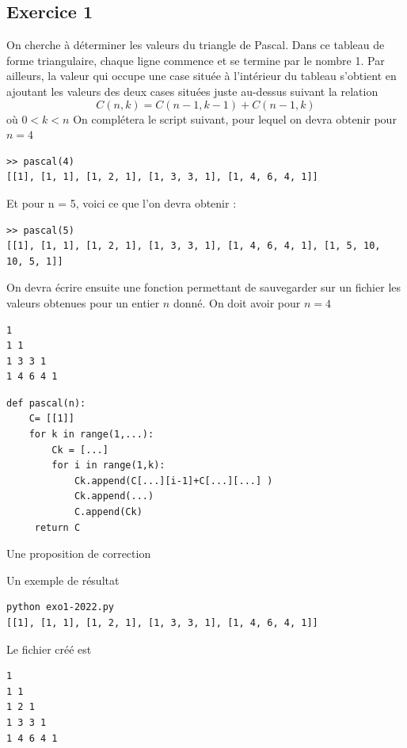 \documentclass[a4paper,12pt]{article}
\begin{document}
\subsection{Exercice 1}
\begin{leftbar}
On cherche à d\'eterminer les valeurs du triangle de Pascal. Dans ce tableau de forme
triangulaire, chaque ligne commence et se termine par le nombre 1. Par ailleurs, la valeur
qui occupe une case situ\'ee à l’int\'erieur du tableau s’obtient en ajoutant les valeurs des
deux cases situ\'ees juste au-dessus suivant la relation
\begin{equation*}
C(n,k)=C(n-1,k-1)+C(n-1,k)
\end{equation*}
o\`u $0<k<n$
On compl\'etera le script suivant, pour lequel on devra obtenir pour $n = 4$
\begin{verbatim}
>> pascal(4)
[[1], [1, 1], [1, 2, 1], [1, 3, 3, 1], [1, 4, 6, 4, 1]]
\end{verbatim}
Et pour n = 5, voici ce que l’on devra obtenir :
\begin{verbatim}
>> pascal(5)
[[1], [1, 1], [1, 2, 1], [1, 3, 3, 1], [1, 4, 6, 4, 1], [1, 5, 10,
10, 5, 1]]
\end{verbatim}
On devra \'ecrire ensuite une fonction permettant de sauvegarder sur un fichier les valeurs obtenues pour un entier $n$ donn\'e. On doit avoir pour $n=4$
\begin{verbatim}
1
1 1
1 3 3 1
1 4 6 4 1 
\end{verbatim}
\end{leftbar}
\begin{verbatim}
def pascal(n):
    C= [[1]]
    for k in range(1,...):
        Ck = [...]
        for i in range(1,k):
            Ck.append(C[...][i-1]+C[...][...] )
            Ck.append(...)
            C.append(Ck)
     return C
\end{verbatim}
\clearpage
Une proposition de correction

Un exemple de r\'esultat
\begin{verbatim}
python exo1-2022.py 
[[1], [1, 1], [1, 2, 1], [1, 3, 3, 1], [1, 4, 6, 4, 1]]
\end{verbatim}
Le fichier cr\'e\'e est 
\begin{verbatim}
1 
1 1 
1 2 1 
1 3 3 1 
1 4 6 4 1 
\end{verbatim}
 


\clearpage
\end{document}
